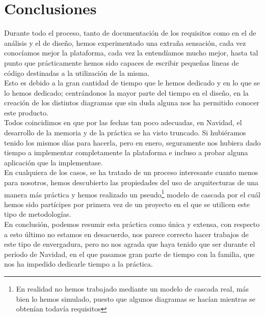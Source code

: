 \chapter{Conclusiones}
\lettrine[lines=1,slope=4pt,findent=0pt]{D}{}urante todo el proceso, tanto de documentación de los requisitos como en el de análisis y el de diseño, hemos experimentado una extraña sensación, cada vez conocíamos mejor la plataforma, cada vez la entendíamos mucho mejor, hasta tal punto que prácticamente hemos sido capaces de escribir pequeñas lineas de código destinadas a la utilización de la misma.\\

Esto es debido a la gran cantidad de tiempo que le hemos dedicado y en lo que se lo hemos dedicado; centrándonos la mayor parte del tiempo en el diseño, en la creación de los distintos diagramas que sin duda alguna nos ha permitido conocer este producto.\\

Todos coincidimos en que por las fechas tan poco adecuadas, en Navidad, el desarrollo de la memoria y de la práctica se ha visto truncado. Si hubiéramos tenido los mismos días para hacerla, pero en enero, seguramente nos hubiera dado tiempo a implementar completamente la plataforma e incluso a probar alguna aplicación que la implementase.\\

En cualquiera de los casos, se ha tratado de un proceso interesante cuanto menos para nosotros, hemos descubierto las propiedades del uso de arquitecturas de una manera más práctica y hemos realizado un pseudo\footnote{En realidad no hemos trabajado mediante un modelo de cascada real, más bien lo hemos simulado, puesto que algunos diagramas se hacían mientras se obtenían todavía requisitos} modelo de cascada por el cuál hemos sido partícipes por primera vez de un proyecto en el que se utilicen este tipo de metodologías.\\

En conclusión, podemos resumir esta práctica como única y extensa, con respecto a esto último no estamos en desacuerdo, nos parece correcto hacer trabajos de este tipo de envergadura, pero no nos agrada que haya tenido que ser durante el período de Navidad, en el que pasamos gran parte de tiempo con la familia, que nos ha impedido dedicarle tiempo a la práctica.

